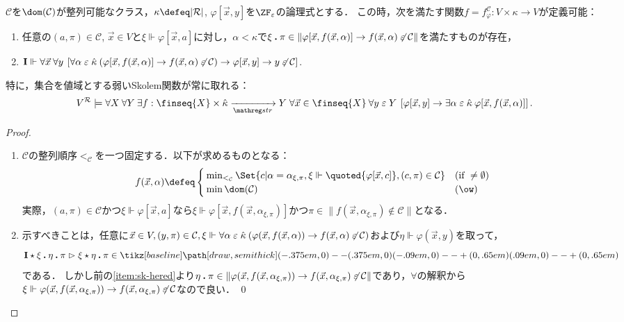 \documentclass[realisability.tex]{subfiles}
\begin{document}
\begin{lemma}\label{lem:weak-skolem-gen}
 $\mathcal{C}$を$\dom(\mathcal{C})$が整列可能なクラス，$\kappa \defeq |\mathcal{R}|$, $\varphi[\vec{x}, y]$を$\ZF_{\varepsilon}$の論理式とする．
 この時，次を満たす関数$f = f^{\mathcal{C}}_{\varphi}: V \times \kappa \to V$が定義可能：
 \begin{enumerate}
  \item \label{item:sk-hered}任意の$(a, \pi) \in \mathcal{C}$, $\vec{x} \in V$と$\xi \Vdash \varphi[\vec{x}, a]$に対し，$\alpha < \kappa$で$\xi \mathbin{\boldsymbol{.}} \pi \in \|\varphi[\vec{x}, f(\vec{x}, \alpha)] \to f(\vec{x}, \alpha) \not\mathrel{\varepsilon} \mathcal{C}\|$を満たすものが存在，
  \item $\mathsf{\mathbf{I}} \Vdash \forall \vec{x} \: \forall y \:\left[ \forall \alpha \mathrel{\varepsilon} \hat{\kappa}\: (\varphi[\vec{x}, f(\vec{x}, \alpha)] \to f(\vec{x},\alpha) \not\mathrel{\varepsilon} \mathcal{C}) \to \varphi[\vec{x}, y] \to y \not\mathrel{\varepsilon} \mathcal{C} \right]$. 
 \end{enumerate}
 特に，集合を値域とする弱いSkolem関数が常に取れる：
 \[
 V^{\mathcal{R}} \models \forall X\: \forall Y \: \exists f: \finseq{X} \times \hat{\kappa} \strto Y\; \forall \vec{x} \in \finseq{X} \:\forall y \strin Y \: 
  \left[\varphi[\vec{x}, y] \to \exists \alpha \strin \hat{\kappa} \: \varphi[\vec{x}, f(\vec{x}, \alpha)]\right].
 \]
\end{lemma}
\begin{proof}
 \begin{enumerate}
  \item $\mathcal{C}$の整列順序${<_{\mathcal{C}}}$を一つ固定する．以下が求めるものとなる：
        \[
         f(\vec{x}, \alpha) \defeq
         \begin{cases}
          \min_{<_{\mathcal{C}}} \Set{c | \alpha = \alpha_{\xi, \pi}, \xi \Vdash \quoted{\varphi[\vec{x}, c]}, (c, \pi) \in \mathcal{C}} & (\text{if } \neq \emptyset)\\
          \min \dom(\mathcal{C}) & (\ow)
         \end{cases}
        \]
        実際，$(a, \pi) \in \mathcal{C}$かつ$\xi \Vdash \varphi[\vec{x}, a]$なら$\xi \Vdash \varphi[\vec{x}, f(\vec{x}, \alpha_{\xi,\pi})]$かつ$\pi \in \|f(\vec{x}, \alpha_{\xi,\pi}) \notin \mathcal{C}\|$となる．
  \item 示すべきことは，任意に$\vec{x} \in V, (y, \pi) \in \mathcal{C}, \xi \Vdash \forall \alpha \mathrel{\varepsilon} \hat{\kappa} \:(\varphi(\vec{x}, f(\vec{x}, \alpha)) \to f(\vec{x}, \alpha) \not\mathrel{\varepsilon} \mathcal{C})$および$\eta \Vdash \varphi(\vec{x}, y)$を取って，
        \[
         \KVM{{\I}{\xi}{\eta}{\pi}} \redsto \KVM{{\xi}{\eta}{\pi}} \in \pole
        \]
        である．
        しかし前の\ref{item:sk-hered}より$\eta \mathbin{\boldsymbol{.}} \pi \in \|\varphi(\vec{x}, f(\vec{x}, \alpha_{\xi,\pi})) \to f(\vec{x}, \alpha_{\xi,\pi}) \not\mathrel{\varepsilon} \mathcal{C}\|$であり，$\forall$の解釈から$\xi \Vdash \varphi(\vec{x}, f(\vec{x}, \alpha_{\xi,\pi})) \to f(\vec{x}, \alpha_{\xi,\pi}) \not\mathrel{\varepsilon} \mathcal{C}$なので良い． \qed
 \end{enumerate}
\end{proof}
\end{document}
